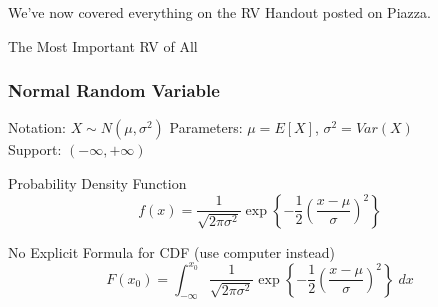 \documentclass[handout]{beamer}
\begin{document}
\begin{frame}

\huge We've now covered everything on the RV Handout posted on Piazza.

\end{frame}
\begin{frame}
\Huge \begin{center}
The Most Important RV of All
\end{center}

\end{frame}
\begin{frame}
\frametitle{Normal Random Variable}
\begin{block}{Notation: $X \sim N(\mu, \sigma^2)$}
Parameters: $\mu = E[X]$, $\sigma^2 = Var(X)$\\ Support:  $(-\infty, +\infty)$
\end{block}


\begin{block}{Probability Density Function}
	$$ f(x) = \frac{1}{\sqrt{2\pi \sigma^2}} \exp \left\{ - \frac{1}{2} \left(\frac{x - \mu}{\sigma} \right)^2 \right\}$$
\end{block}


\begin{block}{No Explicit Formula for CDF (use computer instead)}
	$$F(x_0) = \int_{-\infty}^{x_0}  \frac{1}{\sqrt{2\pi \sigma^2}} \exp \left\{ - \frac{1}{2} \left(\frac{x - \mu}{\sigma} \right)^2 \right\} \; dx$$
\end{block}
\end{frame}

\end{document}
